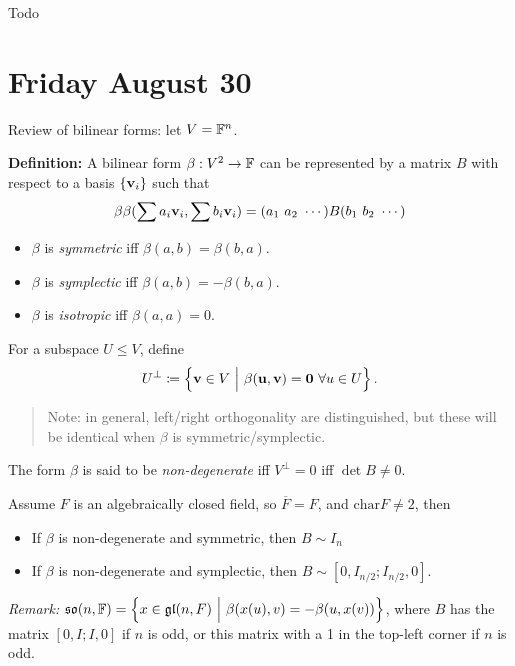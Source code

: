 Todo

\hypertarget{friday-august-30}{%
\section{Friday August 30}\label{friday-august-30}}

Review of bilinear forms: let \(V = {\mathbb{F}}^n\).

\textbf{Definition:} A bilinear form \(\beta: V^2 \to {\mathbb{F}}\) can be
represented by a matrix \(B\) with respect to a basis
\(\left\{{\mathbf{v}_i}\right\}\) such that \[
\beta \beta(\sum a_i \mathbf{v}_i, \sum b_i \mathbf{v}_i) = (a_1 ~a_2 ~\cdots) B (b_1 ~b_2 ~\cdots)
\]

\begin{itemize}
\tightlist
\item
  \(\beta\) is \emph{symmetric} iff \(\beta(a,b) = \beta(b,a)\).
\item
  \(\beta\) is \emph{symplectic} iff \(\beta(a, b) = -\beta(b, a)\).
\item
  \(\beta\) is \emph{isotropic} iff \(\beta(a, a) = 0\).
\end{itemize}

For a subspace \(U \leq V\), define \[
U^\perp \coloneqq \left\{{\mathbf{v}\in V {~\mathrel{\Big|}~} \beta(\mathbf{u}, \mathbf{v}) = \mathbf{0} ~\forall u\in U}\right\}.
\]

\begin{quote}
Note: in general, left/right orthogonality are distinguished, but these
will be identical when \(\beta\) is symmetric/symplectic.
\end{quote}

The form \(\beta\) is said to be \emph{non-degenerate} iff
\(V^\perp = 0\) iff \(\det B \neq 0\).

Assume \(F\) is an algebraically closed field, so \(\overline F = F\),
and \(\mathrm{char} F \neq 2\), then

\begin{itemize}
\tightlist
\item
  If \(\beta\) is non-degenerate and symmetric, then \(B \sim I_n\)
\item
  If \(\beta\) is non-degenerate and symplectic, then
  \(B \sim [0, I_{n/2}; I_{n/2}, 0]\).
\end{itemize}

\emph{Remark:}
\({\mathfrak{so}}(n, {\mathbb{F}}) = \left\{{x\in {\mathfrak{gl}}(n, F) {~\mathrel{\Big|}~} \beta(x(u), v) = -\beta(u, x(v))}\right\}\),
where \(B\) has the matrix \([0, I; I, 0]\) if \(n\) is odd, or this
matrix with a 1 in the top-left corner if \(n\) is odd.

